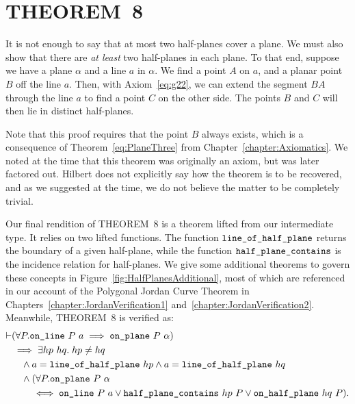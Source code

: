 \section{THEOREM~8}
It is not enough to say that at most two half-planes cover a plane. We must also show that there are \emph{at least} two half-planes in each plane. To that end, suppose we have a plane $\alpha$ and a line $a$ in $\alpha$. We find a  point $A$ on $a$, and a planar point $B$ off the line $a$. Then, with Axiom~\ref{eq:g22}, we can extend the segment $BA$ through the line $a$ to find a point $C$ on the other side. The points $B$ and $C$ will then lie in distinct half-planes. 

Note that this proof requires that the point $B$ always exists, which is a consequence of Theorem~\ref{eq:PlaneThree} from Chapter~\ref{chapter:Axiomatics}. We noted at the time that this theorem was originally an axiom, but was later factored out. Hilbert does not explicitly say how the theorem is to be recovered, and as we suggested at the time, we do not believe the matter to be completely trivial.

Our final rendition of THEOREM~8 is a theorem lifted from our intermediate type. It relies on two lifted functions. The function $\texttt{line\_of\_half\_plane}$ returns the boundary of a given half-plane, while the function $\texttt{half\_plane\_contains}$ is the incidence relation for half-planes. We give some additional theorems to govern these concepts in Figure~\ref{fig:HalfPlanesAdditional}, most of which are referenced in our  account of the Polygonal Jordan Curve Theorem in Chapters~\ref{chapter:JordanVerification1} and~\ref{chapter:JordanVerification2}. Meanwhile, THEOREM~8 is verified as:
\begin{equation}\label{eq:HalfPlaneCover}
  \begin{split}
    \vdash&(\forall P. \texttt{on\_line}\ P\ a \implies \texttt{on\_plane}\ P\ \alpha)\\
    &\implies \exists hp\ hq.\; hp \neq hq\\
    &\quad \wedge a = \texttt{line\_of\_half\_plane}\ hp \wedge a = \texttt{line\_of\_half\_plane}\ hq\\
    &\quad \wedge (\forall P. \texttt{on\_plane}\ P\ \alpha\\
    &\quad\quad \iff \texttt{on\_line}\ P\ a \vee \texttt{half\_plane\_contains}\ hp\ P \vee \texttt{on\_half\_plane}\ hq\ P).
  \end{split}
\end{equation}

